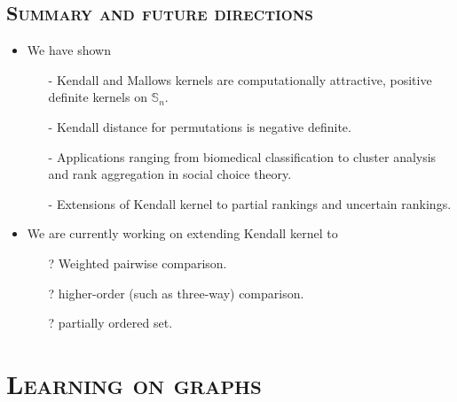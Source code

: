 \documentclass[xcolor=x11names,compress]{beamer}
\theoremstyle{plain}
\renewcommand{\(}{\begin{columns}}
\renewcommand{\)}{\end{columns}}
\newcommand{\<}[1]{\begin{column}{#1}}
\renewcommand{\>}{\end{column}}
\newcommand{\Sn}{\mathbb{S}_n}
\begin{document}
\subsection{\scshape Summary and future directions}
\begin{frame}{\insertsubsection}
	
	\begin{itemize}
		\item We have shown
		\begin{itemize}
		 \item[-] Kendall and Mallows kernels are computationally attractive, positive definite kernels on $\Sn$.
		 \item[-] Kendall distance for permutations is negative definite.
		 \pause
		 \item[-] Applications ranging from biomedical classification to cluster analysis and rank aggregation in social choice theory.
		 \pause
		 \item[-] Extensions of Kendall kernel to partial rankings and uncertain rankings.
		\end{itemize}
		
		\pause
		
		\item We are currently working on extending Kendall kernel to
		\begin{itemize}
			\item[?] Weighted pairwise comparison.
			\item[?] higher-order (such as three-way) comparison.
			\item[?] partially ordered set.
		\end{itemize}
	\end{itemize}
	
\end{frame}

\section{\scshape Learning on graphs}
\end{document}
